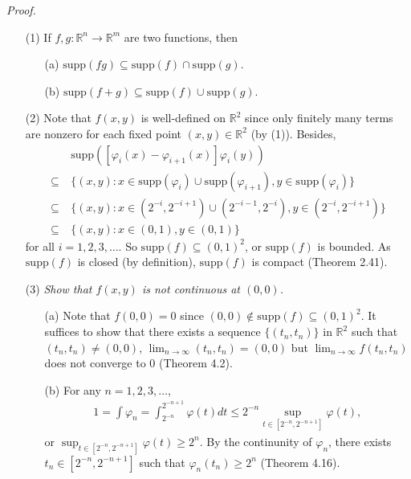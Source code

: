 \documentclass{article}
\begin{document}
\emph{Proof.}
\begin{enumerate}
\item[(1)]
  If $f, g: \mathbb{R}^{n} \to \mathbb{R}^{m}$ are two functions,
  then
  \begin{enumerate}
  \item[(a)]
    $\mathrm{supp}(fg) \subseteq \mathrm{supp}(f) \cap \mathrm{supp}(g)$.
  \item[(b)]
    $\mathrm{supp}(f+g) \subseteq \mathrm{supp}(f) \cup \mathrm{supp}(g)$.
  \end{enumerate}

\item[(2)]
  Note that $f(x,y)$ is well-defined on $\mathbb{R}^2$
  since only finitely many terms are nonzero for each fixed point $(x,y) \in \mathbb{R}^2$ (by (1)).
  Besides,
  \begin{align*}
    &\mathrm{supp}([ \varphi_i(x)-\varphi_{i+1}(x) ] \varphi_i(y)) \\
    \subseteq \: &
    \{ (x,y) :
      x \in \mathrm{supp}(\varphi_i) \cup \mathrm{supp}(\varphi_{i+1}),
      y \in \mathrm{supp}(\varphi_i)
    \} \\
    \subseteq \: &
    \{ (x,y) :
      x \in (2^{-i},2^{-i+1}) \cup (2^{-i-1},2^{-i}),
      y \in (2^{-i},2^{-i+1})
    \} \\
    \subseteq \: &
    \{ (x,y) :
      x \in (0,1),
      y \in (0,1)
    \}
  \end{align*}
  for all $i=1,2,3,\ldots$.
  So $\mathrm{supp}(f) \subseteq (0,1)^2$, or $\mathrm{supp}(f)$ is bounded.
  As $\mathrm{supp}(f)$ is closed (by definition),
  $\mathrm{supp}(f)$ is compact (Theorem 2.41).

\item[(3)]
  \emph{Show that $f(x,y)$ is not continuous at $(0,0)$.}
  \begin{enumerate}
  \item[(a)]
    Note that $f(0,0) = 0$ since $(0,0) \not\in \mathrm{supp}(f) \subseteq (0,1)^2$.
    It suffices to show that there exists a sequence
    $\{ (t_n,t_n) \}$ in $\mathbb{R}^2$ such that
    $(t_n,t_n) \neq (0,0)$, $\lim_{n \to \infty}(t_n,t_n) = (0,0)$
    but $\lim_{n \to \infty} f(t_n,t_n)$ does not converge to $0$
    (Theorem 4.2).

  \item[(b)]
    For any $n = 1,2,3,\ldots$,
    \begin{align*}
      1
      = \int \varphi_n
      = \int_{2^{-n}}^{2^{-n+1}} \varphi(t)dt
      \leq 2^{-n} \sup_{t \in [2^{-n},2^{-n+1}]} \varphi(t),
    \end{align*}
    or $\sup_{t \in [2^{-n},2^{-n+1}]} \varphi(t) \geq 2^n$.
    By the continunity of $\varphi_n$, there exists $t_n \in [2^{-n},2^{-n+1}]$
    such that $\varphi_n(t_n) \geq 2^n$ (Theorem 4.16).


\end{enumerate}
\end{enumerate}
\end{document}
